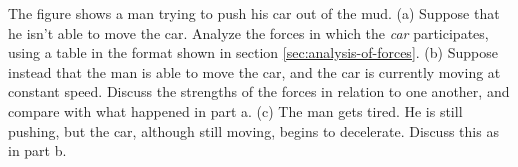 The figure shows a man trying to push his car out of the mud. (a) Suppose that he isn't
able to move the car. Analyze the forces in which the \emph{car} participates,
using a table in the format shown in section \ref{sec:analysis-of-forces}.
(b) Suppose instead that the man is able to move the car, and the car is currently
moving at constant speed. Discuss the strengths of the forces in relation to one
another, and compare with what happened in part a.
(c) The man gets tired. He is still pushing, but the car, although still moving, begins to decelerate.
Discuss this as in part b.
